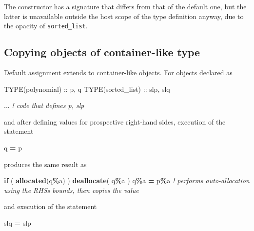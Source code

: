 \documentclass[
  paper=a4,
  ,captions=tableheading
]{scrartcl}
\newenvironment{Shaded}{\begin{snugshade}}{\end{snugshade}}
\newcommand{\CommentTok}[1]{\textcolor[rgb]{0.56,0.35,0.01}{\textit{#1}}}
\newcommand{\DataTypeTok}[1]{\textcolor[rgb]{0.13,0.29,0.53}{#1}}
\newcommand{\FunctionTok}[1]{\textcolor[rgb]{0.13,0.29,0.53}{\textbf{#1}}}
\newcommand{\KeywordTok}[1]{\textcolor[rgb]{0.13,0.29,0.53}{\textbf{#1}}}
\newcommand{\NormalTok}[1]{#1}
\newcommand{\OperatorTok}[1]{\textcolor[rgb]{0.81,0.36,0.00}{\textbf{#1}}}
\begin{document}
The constructor has a signature that differs from that of the default
one, but the latter is unavailable outside the host scope of the type
definition anyway, due to the opacity of \texttt{sorted\_list}.

\subsection{Copying objects of container-like
type}\label{copying-objects-of-container-like-type}

Default assignment extends to container-like objects. For objects
declared as

\begin{Shaded}
\begin{Highlighting}[]
\DataTypeTok{TYPE(polynomial)} \DataTypeTok{::}\NormalTok{ p, q}
\DataTypeTok{TYPE(sorted\_list)} \DataTypeTok{::}\NormalTok{ slp, slq}

\NormalTok{... }\CommentTok{! code that defines p, slp}
\end{Highlighting}
\end{Shaded}

and after defining values for prospective right-hand sides, execution of
the statement

\begin{Shaded}
\begin{Highlighting}[]
\NormalTok{q }\KeywordTok{=}\NormalTok{ p}
\end{Highlighting}
\end{Shaded}

produces the same result as

\begin{Shaded}
\begin{Highlighting}[]
\KeywordTok{if}\NormalTok{ ( }\FunctionTok{allocated}\NormalTok{(q}\OperatorTok{\%}\NormalTok{a) ) }\KeywordTok{deallocate}\NormalTok{( q}\OperatorTok{\%}\NormalTok{a )}
\NormalTok{q}\OperatorTok{\%}\NormalTok{a }\KeywordTok{=}\NormalTok{ p}\OperatorTok{\%}\NormalTok{a  }\CommentTok{! performs auto{-}allocation using the RHS\textquotesingle{}s bounds, then copies the value}
\end{Highlighting}
\end{Shaded}

and execution of the statement

\begin{Shaded}
\begin{Highlighting}[]
\NormalTok{slq }\KeywordTok{=}\NormalTok{ slp}
\end{Highlighting}
\end{Shaded}
\end{document}
